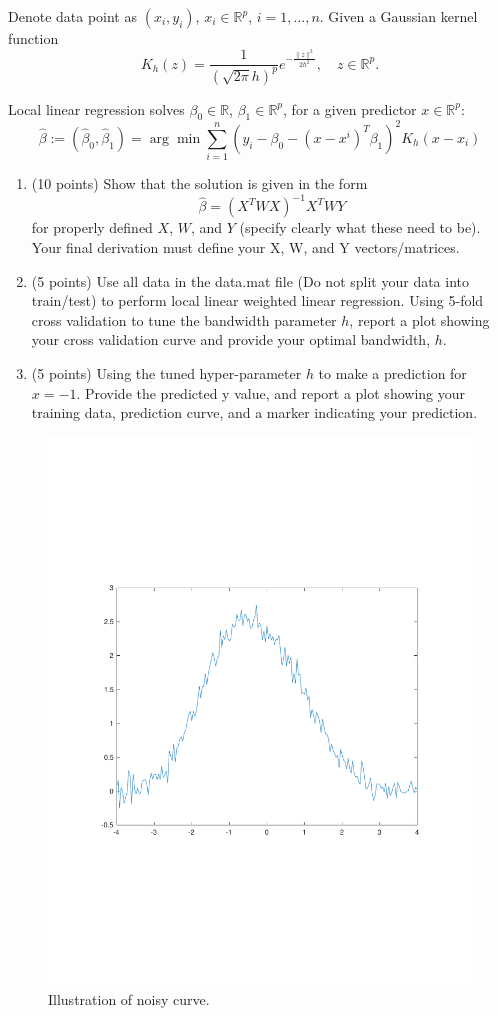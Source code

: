 \documentclass[twoside,10pt]{article}
\begin{document}
\begin{enumerate}[label*=\arabic*.]
Denote data point as $(x_i, y_i)$, $x_i \in \mathbb R^p$,  $i = 1, \ldots, n$. Given a Gaussian kernel function 
\[K_h(z) = \frac{1}{(\sqrt{2\pi}h)^p} e^{-\frac{\|z\|^2}{2h^2}}, \quad z \in \mathbb R^p.\]

Local linear regression solves $\beta_0\in \mathbb R$, $\beta_1 \in \mathbb R^p$, for a given predictor $x \in \mathbb R^p$:
\[
\widehat \beta:= (\widehat \beta_0, \widehat\beta_1) = \arg\min \sum_{i=1}^n (y_i - \beta_0 -(x-x^i)^T \beta_1)^2 K_h(x- x_i)
\]

\begin{enumerate}[label*=\arabic*.]
\item (10 points) Show that the solution is given in the form
\[
\widehat \beta = (X^T  W X)^{-1} X^T W Y
\]
for properly defined $X$, $W$, and $Y$ (specify clearly what these need to be). Your final derivation must define your X, W, and Y vectors/matrices.

\item (5 points) Use all data in the data.mat file (Do not split your data into train/test) to perform local linear weighted linear regression. Using 5-fold cross validation to tune the bandwidth parameter $h$, report a plot showing your cross validation curve and provide your optimal bandwidth, $h$.

\item  (5 points) Using the tuned hyper-parameter $h$ to make a prediction for $x = -1$. Provide the predicted y value, and report a plot showing your training data, prediction curve, and a marker indicating your prediction.
\end{enumerate}


 

\end{enumerate}


\begin{figure}[h!]
\begin{center}
\includegraphics[width =.5 \textwidth]{noisy_curve.pdf}
\end{center}
\caption{Illustration of  noisy curve.}
\end{figure}
\end{document}
